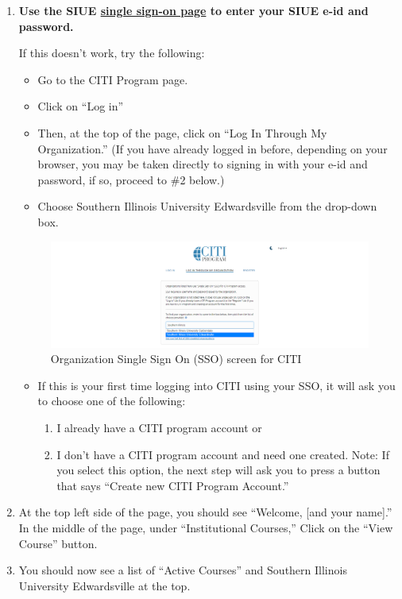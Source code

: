 \documentclass[
]{book}
\begin{document}
\begin{enumerate}
\def\labelenumi{\arabic{enumi}.}
\item
  \textbf{Use the SIUE \href{https://www.citiprogram.org/Shibboleth.sso/Login?target=https\%3A\%2F\%2Fwww.citiprogram.org\%2FSecure\%2FWelcome.cfm?inst=551&entityID=https\%3A\%2F\%2Fsts.windows.net\%2F99f37d21-0b5c-43ea-9103-e16f02f5aecf\%2F}{single sign-on page} to enter your SIUE e-id and password.}

  If this doesn't work, try the following:

  \begin{itemize}
  \item
    Go to the CITI Program page.
  \item
    Click on ``Log in''
  \item
    Then, at the top of the page, click on ``Log In Through My Organization.'' (If you have already logged in before, depending on your browser, you may be taken directly to signing in with your e-id and password, if so, proceed to \#2 below.)
  \item
    Choose Southern Illinois University Edwardsville from the drop-down box.
  \end{itemize}

  \begin{figure}
  \centering
  \includegraphics[width=1\textwidth,height=\textheight]{images/citi-org-login.png}
  \caption{Organization Single Sign On (SSO) screen for CITI}
  \end{figure}

  \begin{itemize}
  \item
    If this is your first time logging into CITI using your SSO, it will ask you to choose one of the following:

    \begin{enumerate}
    \def\labelenumii{\arabic{enumii}.}
    \item
      I already have a CITI program account or
    \item
      I don't have a CITI program account and need one created. Note: If you select this option, the next step will ask you to press a button that says ``Create new CITI Program Account.''
    \end{enumerate}
  \end{itemize}
\item
  At the top left side of the page, you should see ``Welcome, {[}and your name{]}.'' In the middle of the page, under ``Institutional Courses,'' Click on the ``View Course'' button.
\item
  You should now see a list of ``Active Courses'' and Southern Illinois University Edwardsville at the top.
\end{enumerate}
\end{document}
